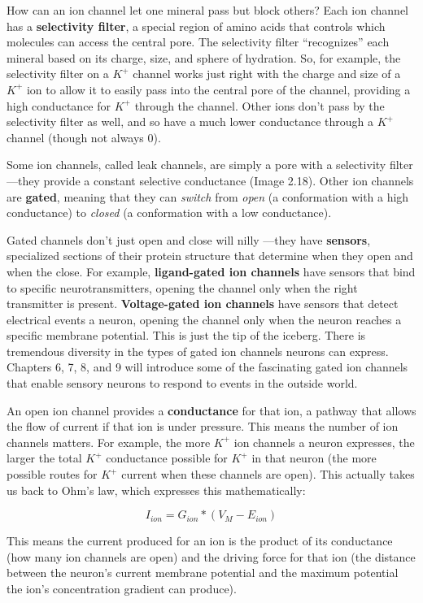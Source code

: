 \documentclass[
]{book}
\begin{document}
How can an ion channel let one mineral pass but block others? Each ion channel has a \textbf{selectivity filter}, a special region of amino acids that controls which molecules can access the central pore. The selectivity filter ``recognizes'' each mineral based on its charge, size, and sphere of hydration. So, for example, the selectivity filter on a \(K^+\) channel works just right with the charge and size of a \(K^+\) ion to allow it to easily pass into the central pore of the channel, providing a high conductance for \(K^+\) through the channel. Other ions don't pass by the selectivity filter as well, and so have a much lower conductance through a \(K^+\) channel (though not always 0).

Some ion channels, called leak channels, are simply a pore with a selectivity filter---they provide a constant selective conductance (Image 2.18). Other ion channels are \textbf{gated}, meaning that they can \emph{switch} from \emph{open} (a conformation with a high conductance) to \emph{closed} (a conformation with a low conductance).

Gated channels don't just open and close will nilly ---they have \textbf{sensors}, specialized sections of their protein structure that determine when they open and when the close. For example, \textbf{ligand-gated ion channels} have sensors that bind to specific neurotransmitters, opening the channel only when the right transmitter is present. \textbf{Voltage-gated ion channels} have sensors that detect electrical events a neuron, opening the channel only when the neuron reaches a specific membrane potential. This is just the tip of the iceberg. There is tremendous diversity in the types of gated ion channels neurons can express. Chapters 6, 7, 8, and 9 will introduce some of the fascinating gated ion channels that enable sensory neurons to respond to events in the outside world.

An open ion channel provides a \textbf{conductance} for that ion, a pathway that allows the flow of current if that ion is under pressure. This means the number of ion channels matters. For example, the more \(K^+\) ion channels a neuron expresses, the larger the total \(K^+\) conductance possible for \(K^+\) in that neuron (the more possible routes for \(K^+\) current when these channels are open). This actually takes us back to Ohm's law, which expresses this mathematically:

\[I_{ion} = G_{ion} * (V_{M} - E_{ion})  \]

This means the current produced for an ion is the product of its conductance (how many ion channels are open) and the driving force for that ion (the distance between the neuron's current membrane potential and the maximum potential the ion's concentration gradient can produce).
\end{document}
